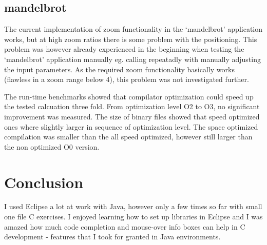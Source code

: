 \documentclass[a4paper,11pt,twoside]{article}
\begin{document}
\subsection{mandelbrot}
The current implementation of zoom functionality in the `mandelbrot' application
works, but at high zoom ratios there is some problem with the positioning.
This problem was however already experienced in the beginning when testing the
`mandelbrot' application manually eg. calling repeatadly with manually adjusting
the input parameters. As the required zoom functionality basically works (flawless
in a zoom range below 4), this problem was not investigated further.

The run-time benchmarks showed that compilator optimization could speed up
the tested calcuation three fold. From optimization level O2 to O3, no significant
improvement was measured. The size of binary files showed that speed optimized
ones where slightly larger in sequence of optimization level. The space optimized
compilation was smaller than the all speed optimized, however still larger than
the non optimized O0 version.

\section{Conclusion}
I used Eclipse a lot at work with Java, however only a few times so far with
small one file C exercises. I enjoyed learning how to set up libraries in Eclipse
and I was amazed how much code completion and mouse-over info boxes can help in
C development - features that I took for granted in Java environments.   


%
\end{document}
